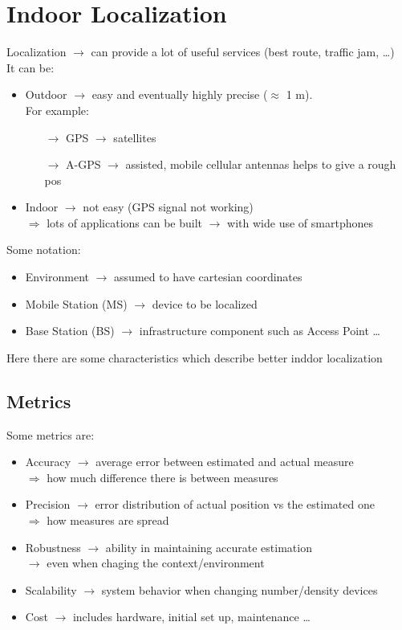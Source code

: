 \section{Indoor Localization}
Localization $\rightarrow$ can provide a lot of useful services (best route, traffic jam,
\dots)\\It can be:
\begin{itemize}
    \item Outdoor $\rightarrow$  easy and eventually highly precise ($\approx$ 1 m).\\
    For example:
    \begin{itemize}
        \item[$\rightarrow$] GPS $\rightarrow$ satellites
        \item[$\rightarrow$] A-GPS $\rightarrow$ assisted, mobile cellular antennas
        helps to give a rough pos
    \end{itemize}
    \item Indoor $\rightarrow$ not easy (GPS signal not working)\\
    $\Rightarrow$ lots of applications can be built $\rightarrow$ with wide use of smartphones
\end{itemize}
Some notation:
\begin{itemize}
    \item Environment $\rightarrow$ assumed to have cartesian coordinates
    \item Mobile Station (MS) $\rightarrow$ device to be localized
    \item Base Station (BS) $\rightarrow$ infrastructure component such as Access Point \dots
\end{itemize}
Here there are some characteristics which describe better inddor localization

\subsection{Metrics}
Some metrics are:
\begin{itemize}
    \item Accuracy $\rightarrow$ average error between estimated
    and actual measure\\
    $\Rightarrow$ how much difference there is between measures
    \item Precision $\rightarrow$ error distribution of actual position
    vs the estimated one\\
    $\Rightarrow$ how measures are spread
    \item Robustness $\rightarrow$ ability in maintaining accurate
    estimation\\$\rightarrow$ even when chaging the context/environment
    \item Scalability $\rightarrow$ system behavior when changing 
    number/density devices
    \item Cost $\rightarrow$ includes hardware, initial set up, maintenance
    \dots
\end{itemize}

